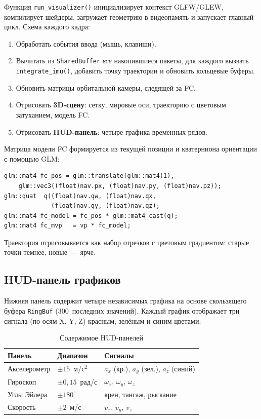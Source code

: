 \documentclass[../main.tex]{subfiles}
\begin{document}
Функция \texttt{run\_visualizer()} инициализирует контекст GLFW/GLEW,
компилирует шейдеры, загружает геометрию в видеопамять и запускает главный
цикл. Схема каждого кадра:
\begin{enumerate}[leftmargin=2cm]
    \item Обработать события ввода (мышь, клавиши).
    \item Вычитать из \texttt{SharedBuffer} \textit{все} накопившиеся
          пакеты, для каждого вызвать \texttt{integrate\_imu()}, добавить
          точку траектории и обновить кольцевые буферы.
    \item Обновить матрицы орбитальной камеры, следящей за FC.
    \item Отрисовать \textbf{3D-сцену}:
          сетку, мировые оси, траекторию с цветовым затуханием, модель FC.
    \item Отрисовать \textbf{HUD-панель}:
          четыре графика временных рядов.
\end{enumerate}
 
Матрица модели FC формируется из текущей позиции и кватерниона ориентации с
помощью GLM:
 
\begin{lstlisting}[caption={Матрица модели из позиции и кватерниона}]
glm::mat4 fc_pos = glm::translate(glm::mat4(1),
    glm::vec3((float)nav.px, (float)nav.py, (float)nav.pz));
glm::quat  q((float)nav.qw, (float)nav.qx,
             (float)nav.qy, (float)nav.qz);
glm::mat4 fc_model = fc_pos * glm::mat4_cast(q);
glm::mat4 fc_mvp   = vp * fc_model;
\end{lstlisting}
 
Траектория отрисовывается как набор отрезков с цветовым градиентом: старые
точки темнее, новые~--- ярче.
 
\subsection{HUD-панель графиков}
 
Нижняя панель содержит четыре независимых графика на основе скользящего
буфера \texttt{RingBuf} (300~последних значений). Каждый график отображает
три сигнала (по осям X, Y, Z) красным, зелёным и синим цветами:
 
\begin{table}[H]
\centering
\caption{Содержимое HUD-панелей}
\label{tab:hud}
\begin{tabularx}{\textwidth}{|>{\centering\arraybackslash}p{3cm}|
                               >{\centering\arraybackslash}p{3cm}|
                               X|}
\hline
\textbf{Панель} & \textbf{Диапазон} & \textbf{Сигналы} \\
\hline
Акселерометр & $\pm15$~м/с$^2$ & $a_x$ (кр.), $a_y$ (зел.), $a_z$ (синий) \\
\hline
Гироскоп     & $\pm0{,}15$~рад/с & $\omega_x$, $\omega_y$, $\omega_z$ \\
\hline
Углы Эйлера  & $\pm180^{\circ}$   & крен, тангаж, рыскание \\
\hline
Скорость     & $\pm2$~м/с        & $v_x$, $v_y$, $v_z$ \\
\hline
\end{tabularx}
\end{table}
 
\newpage
	
\end{document}
